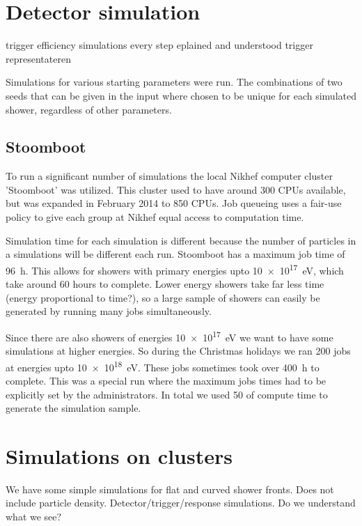 \section{Detector simulation}

trigger efficiency
simulations
every step eplained and understood
trigger representateren

Simulations for various starting parameters were run. The combinations
of two seeds that can be given in the input where chosen to be unique
for each simulated shower, regardless of other parameters.


\subsection{Stoomboot}

To run a significant number of simulations the local Nikhef
computer cluster 'Stoomboot' was utilized. This cluster used to have
around 300 CPUs available, but was expanded in February 2014 to 850
CPUs. Job queueing uses a fair-use policy to give each group at Nikhef
equal access to computation time.

Simulation time for each simulation is different because the number of
particles in a simulations will be different each run. Stoomboot has a
maximum job time of \SI{96}{\hour}. This allows for showers with primary
energies upto \SI{10e17}{\electronvolt}, which take around 60 hours to
complete. Lower energy showers take far less time (energy proportional
to time?), so a large sample of showers can easily be generated by
running many jobs simultaneously.

Since there are also showers of energies \SI{10e17}{\electronvolt} we
want to have some simulations at higher energies. So during the
Christmas holidays we ran 200 jobs at energies upto
\SI{10e18}{\electronvolt}. These jobs sometimes took over
\SI{400}{\hour} to complete. This was a special run where the maximum
jobs times had to be explicitly set by the administrators. In total we
used \SI{50}{\year} of compute time to generate the simulation sample.



\section{Simulations on clusters}

We have some simple simulations for flat and curved shower fronts.
Does not include particle density.
Detector/trigger/response simulations. Do we understand what we see?


